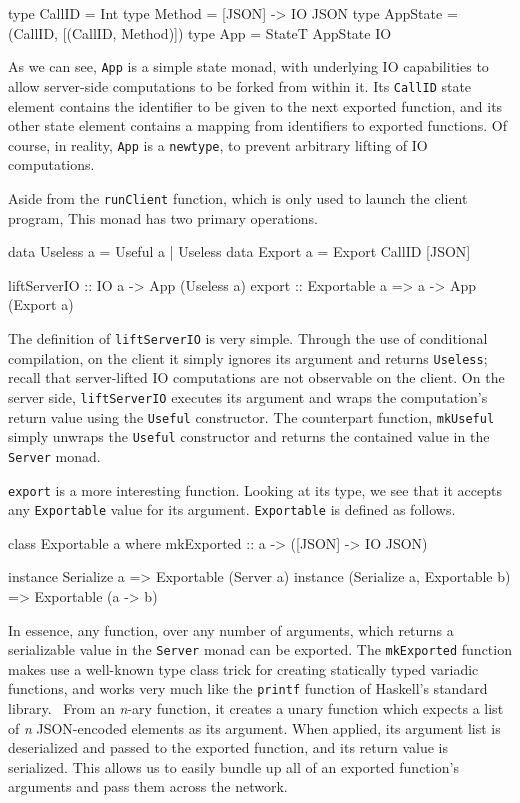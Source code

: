 \documentclass[preprint]{sigplanconf}
\begin{document}
\begin{code}
type CallID = Int
type Method = [JSON] -> IO JSON
type AppState = (CallID, [(CallID, Method)])
type App = StateT AppState IO
\end{code}

As we can see, \lstinline!App! is a simple state monad, with underlying IO
capabilities to allow server-side computations to be forked from within it.
Its \lstinline!CallID! state element contains the identifier to be given to the
next exported function, and its other state element contains a mapping from
identifiers to exported functions. Of course, in reality, \lstinline!App! is a
\lstinline!newtype!, to prevent arbitrary lifting of IO computations.

Aside from the \lstinline!runClient! function, which is only used to launch the
client program, This monad has two primary operations.

\begin{code}
data Useless a = Useful a | Useless
data Export a = Export CallID [JSON]

liftServerIO :: IO a -> App (Useless a)
export :: Exportable a => a -> App (Export a)
\end{code}

The definition of \lstinline!liftServerIO! is very simple. Through the use of
conditional compilation, on the client it simply ignores its argument and
returns \lstinline!Useless!; recall that server-lifted IO computations are not
observable on the client. On the server side, \lstinline!liftServerIO! executes
its argument and wraps the computation's return value using the
\lstinline!Useful! constructor. The counterpart function, \lstinline!mkUseful!
simply unwraps the \lstinline!Useful! constructor and returns the contained
value in the \lstinline!Server! monad.

\lstinline!export! is a more interesting function. Looking at its type, we see
that it accepts any \lstinline!Exportable! value for its argument.
\lstinline!Exportable! is defined as follows.

\begin{code}
class Exportable a where
  mkExported :: a -> ([JSON] -> IO JSON)

instance Serialize a =>
         Exportable (Server a)
instance (Serialize a, Exportable b) =>
         Exportable (a -> b)
\end{code}

In essence, any function, over any number of arguments, which returns a
serializable value in the \lstinline!Server! monad can be exported. The
\lstinline!mkExported! function makes use a well-known type class trick for
creating statically typed variadic functions, and works very much like the
\lstinline!printf! function of Haskell's standard library.\ \cite{printf}
From an \emph{n}-ary function, it creates a unary function which expects
a list of \emph{n} JSON-encoded elements as its argument. When applied, its
argument list is deserialized and passed to the exported function, and its
return value is serialized. This allows us to easily bundle up all of an
exported function's arguments and pass them across the network.
\end{document}
